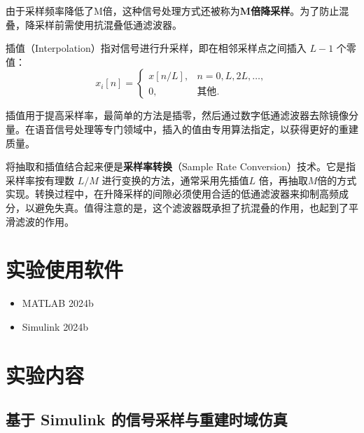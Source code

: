 由于采样频率降低了M倍，这种信号处理方式还被称为\textbf{M倍降采样}。为了防止混叠，降采样前需使用抗混叠低通滤波器。

\begin{definition}[离散时间信号的插值]
  插值（Interpolation）指对信号进行升采样，即在相邻采样点之间插入 $L-1$ 个零值：
\begin{equation}
    x_i[n] = \begin{cases}
        x[n/L], & n = 0,  L,  2L, \ldots, \\
        0, & \text{其他}.
    \end{cases}
\end{equation}
\end{definition}

插值用于提高采样率，最简单的方法是插零，然后通过数字低通滤波器去除镜像分量。在语音信号处理等专门领域中，插入的值由专用算法指定，以获得更好的重建质量。

将抽取和插值结合起来便是\textbf{采样率转换}（Sample Rate Conversion）技术。它是指采样率按有理数 $L/M$ 进行变换的方法，通常采用先插值$L$ 倍，再抽取$M$倍的方式实现。转换过程中，在升降采样的间隙必须使用合适的低通滤波器来抑制高频成分，以避免失真。值得注意的是，这个滤波器既承担了抗混叠的作用，也起到了平滑滤波的作用。


\section{实验使用软件}
\begin{itemize}
  \item MATLAB 2024b
  \item Simulink 2024b
\end{itemize}

\section{实验内容}

\subsection{基于 Simulink 的信号采样与重建时域仿真}


